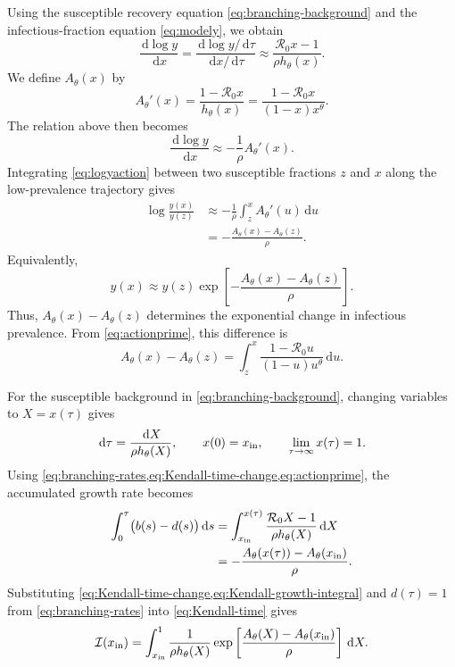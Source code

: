 \documentclass[11pt]{article}
\newcommand{\Rzero}{\mathcal R_0}
\newcommand{\rhoeps}{\rho}
\newcommand{\hth}{h_\theta}
\newcommand{\xin}{x_{\rm in}}
\newcommand{\Ath}{A_\theta}
\newcommand{\dd}{\,\mathrm d}
\begin{document}
Using the susceptible recovery equation \cref{eq:branching-background} and the infectious-fraction equation \cref{eq:modely}, we obtain
\begin{equation}
\frac{\dd\log y}{\dd x}
=\frac{\dd\log y/\dd\tau}{\dd x/\dd\tau}
\approx\frac{\Rzero x-1}{\rhoeps\hth(x)}.
\label{eq:logy-versus-x}
\end{equation}
We define \(\Ath(x)\) by
\begin{equation}
\Ath'(x)=\frac{1-\Rzero x}{\hth(x)}
=\frac{1-\Rzero x}{(1-x)x^\theta}.
\label{eq:actionprime}
\end{equation}
The relation above then becomes
\begin{equation}
\frac{\dd\log y}{\dd x}\approx-\frac{1}{\rhoeps}\Ath'(x).
\label{eq:logyaction}
\end{equation}
Integrating \cref{eq:logyaction} between two susceptible fractions \(z\) and \(x\) along the low-prevalence trajectory gives
\begin{equation}
\begin{aligned}
\log\frac{y(x)}{y(z)}
&\approx-\frac1{\rhoeps}\int_z^x\Ath'(u)\dd u\\
&=-\frac{\Ath(x)-\Ath(z)}{\rhoeps}.
\end{aligned}
\label{eq:logy-action-difference}
\end{equation}
Equivalently,
\begin{equation}
y(x)\approx y(z)\exp\!\left[-\frac{\Ath(x)-\Ath(z)}{\rhoeps}\right].
\label{eq:y-action-propagation}
\end{equation}
Thus, \(\Ath(x)-\Ath(z)\) determines the exponential change in infectious prevalence. From \cref{eq:actionprime}, this difference is
\begin{equation}
\Ath(x)-\Ath(z)=\int_z^x\frac{1-\Rzero u}{(1-u)u^\theta}\dd u.
\label{eq:actiondifference}
\end{equation}

For the susceptible background in \cref{eq:branching-background}, changing variables to \(X=x(\tau)\) gives
\begin{equation}
\dd\tau=\frac{\dd X}{\rhoeps\hth(X)},\qquad
x(0)=\xin,\qquad \lim_{\tau\to\infty}x(\tau)=1.
\label{eq:Kendall-time-change}
\end{equation}
Using \cref{eq:branching-rates,eq:Kendall-time-change,eq:actionprime}, the accumulated growth rate becomes
\begin{equation}
\begin{aligned}
\int_0^\tau\bigl(b(s)-d(s)\bigr)\dd s
&=\int_{\xin}^{x(\tau)}\frac{\Rzero X-1}{\rhoeps\hth(X)}\dd X\\
&=-\frac{\Ath(x(\tau))-\Ath(\xin)}{\rhoeps}.
\end{aligned}
\label{eq:Kendall-growth-integral}
\end{equation}
Substituting \cref{eq:Kendall-time-change,eq:Kendall-growth-integral} and \(d(\tau)=1\) from \cref{eq:branching-rates} into \cref{eq:Kendall-time} gives
\begin{equation}
\mathcal{I}(\xin)=
\int_{\xin}^{1}
\frac{1}{\rhoeps\hth(X)}
\exp\left[\frac{\Ath(X)-\Ath(\xin)}{\rhoeps}\right]\dd X.
\label{eq:Kendall}
\end{equation}
\end{document}
